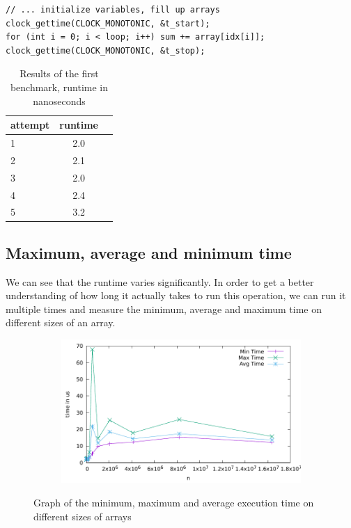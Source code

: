 \documentclass[a4paper,11pt]{article}
\begin{document}
\begin{verbatim}
// ... initialize variables, fill up arrays
clock_gettime(CLOCK_MONOTONIC, &t_start);
for (int i = 0; i < loop; i++) sum += array[idx[i]];
clock_gettime(CLOCK_MONOTONIC, &t_stop);
\end{verbatim}
\begin{table}[H]
  \begin{center}
    \begin{tabular}{l|c|c}
      \textbf{attempt} & \textbf{runtime}\\
      \hline
      1      &  2.0\\
      2      &  2.1\\
      3      &  2.0\\
      4      &  2.4\\
      5      &  3.2\\
    \end{tabular}
    \caption{Results of the first benchmark, runtime in nanoseconds}
    \label{tab:table1}
  \end{center}
\end{table}

\subsection*{Maximum, average and minimum time}
We can see that the runtime varies significantly.
In order to get a better understanding of how long it actually takes to run this operation, we can run it multiple times and measure the minimum, average and maximum time on different sizes of an array.

\begin{figure}[h]
  \centering
  \begin{subfigure}[b]{.5\textwidth}
    \centering
    \includegraphics[width=\textwidth]{./min_max_average/data} %
  \end{subfigure}
  \caption{Graph of the minimum, maximum and average execution time on different sizes of arrays}
  \label{fig:graph_1}
\end{figure}
\end{document}
